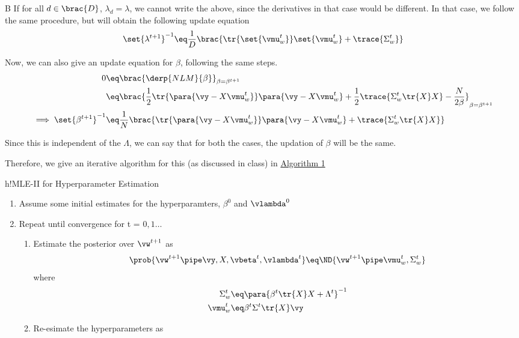 \documentclass{article}
\begin{document}
\begin{question}
\begin{qpart}{B}
		If for all $d \in \brac{D}$, $\lambda_d = \lambda$, we cannot write the above, since the derivatives in that case would be different.
		In that case, we follow the same procedure, but will obtain the following update equation
		\begin{align*}
			\set{\lambda^{t + 1}}^{-1}	\eq	\frac{1}{D} \brac{\tr{\set{\vmu_w^t}} \set{\vmu_w^t} + \trace{\Sigma_w^t}}
		\end{align*}

		Now, we can also give an update equation for $\beta$, following the same steps.
		\begin{align*}
			0	&\eq	\brac{\derp{NLM}{\beta}}_{\beta = \beta^{t + 1}} \\
			&\eq	\brac{\frac{1}{2} \tr{\para{\vy - X \vmu_w^t}} \para{\vy - X \vmu_w^t} + \frac{1}{2} \trace{\Sigma_w^t \tr{X} X} - \frac{N}{2 \beta}}_{\beta = \beta^{t + 1}} \\
			\implies \set{\beta^{t + 1}}^{-1}	&\eq	\frac{1}{N} \brac{\tr{\para{\vy - X \vmu_w^t}} \para{\vy - X \vmu_w^t} + \trace{\Sigma_w^t \tr{X} X}}
		\end{align*}

		Since this is independent of the $\Lambda$, we can say that for both the cases, the updation of $\beta$ will be the same.

		Therefore, we give an iterative algorithm for this (as discussed in class) in \hyperlink{algo:1}{Algorithm 1}

		\begin{algo}[0.9\textwidth]{h!}{MLE-II for Hyperparameter Estimation}

			\begin{enumerate}
				\item Assume some initial estimates for the hyperparamters, $\beta^0$ and $\vlambda^0$
				\item Repeat until convergence for t = $0, 1 \dots$
					\begin{enumerate}
						\item Estimate the posterior over $\vw^{t + 1}$ as
							\begin{align*}
								\prob{\vw^{t + 1} \pipe \vy, X, \vbeta^t, \vlambda^t}	\eq	\ND{\vw^{t + 1} \pipe \vmu_w^t, \Sigma_w^t}
							\end{align*}
							where
							\begin{align*}
								\Sigma_w^t	&\eq	\para{\beta^t \tr{X} X + \Lambda^t}^{-1} \\
								\vmu_w^t	&\eq	\beta^t \Sigma^t \tr{X} \vy
							\end{align*}
						\item Re-esimate the hyperparameters as


\end{enumerate}
\end{enumerate}
\end{algo}
\end{qpart}
\end{question}
\end{document}
